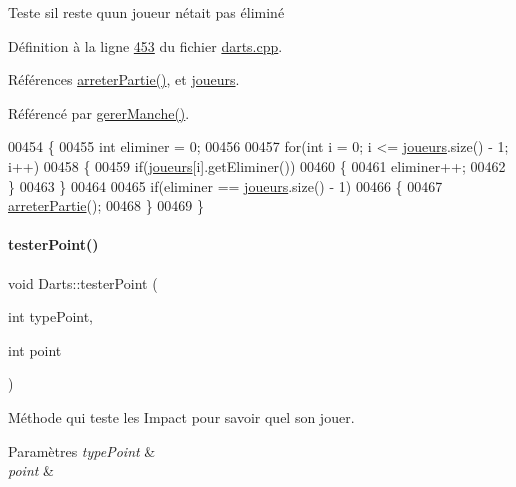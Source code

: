 Teste s\textquotesingle{}il reste qu\textquotesingle{}un joueur n\textquotesingle{}était pas éliminé 



Définition à la ligne \hyperlink{darts_8cpp_source_l00453}{453} du fichier \hyperlink{darts_8cpp_source}{darts.\+cpp}.



Références \hyperlink{darts_8cpp_source_l00422}{arreter\+Partie()}, et \hyperlink{darts_8h_source_l00073}{joueurs}.



Référencé par \hyperlink{darts_8cpp_source_l00303}{gerer\+Manche()}.


\begin{DoxyCode}
00454 \{
00455     \textcolor{keywordtype}{int} eliminer = 0;
00456 
00457     \textcolor{keywordflow}{for}(\textcolor{keywordtype}{int} i = 0; i <= \hyperlink{class_darts_a81bc116f3ae70cea1f492f87f01901c7}{joueurs}.size() - 1; i++)
00458     \{
00459         \textcolor{keywordflow}{if}(\hyperlink{class_darts_a81bc116f3ae70cea1f492f87f01901c7}{joueurs}[i].getEliminer())
00460         \{
00461             eliminer++;
00462         \}
00463     \}
00464 
00465     \textcolor{keywordflow}{if}(eliminer == \hyperlink{class_darts_a81bc116f3ae70cea1f492f87f01901c7}{joueurs}.size() - 1)
00466     \{
00467         \hyperlink{class_darts_aa9685f754172d995cdd04d39d9651227}{arreterPartie}();
00468     \}
00469 \}
\end{DoxyCode}
\mbox{\label{class_darts_a7244911a7b1fe50023987a1c802a5103}} 
\paragraph{\texorpdfstring{tester\+Point()}{testerPoint()}}
{\footnotesize\ttfamily void Darts\+::tester\+Point (\begin{DoxyParamCaption}\item[{int}]{type\+Point,  }\item[{int}]{point }\end{DoxyParamCaption})\hspace{0.3cm}{\ttfamily [private]}}



Méthode qui teste les Impact pour savoir quel son jouer. 


\begin{DoxyParams}{Paramètres}
{\em type\+Point} & \\
\hline
{\em point} & \\
\hline
\end{DoxyParams}


